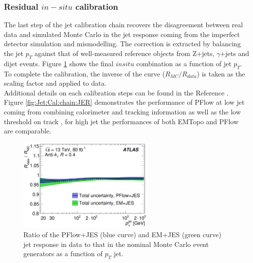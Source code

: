\subsubsection{Residual $in-situ$ calibration}
\label{Jet:Cal:chain:InSitu}
The last step of the jet calibration chain recovers the disagreement between real data and simulated Monte Carlo in the jet response coming from the imperfect detector simulation and mismodelling. The correction is extracted by balancing the jet $p_T$ against that of well-measured reference objects from Z+jets, $\gamma$+jets and dijet events. Figure \ref{fig:Jet:Cal:chain:InSitu} shows the final $in situ$ combination as a function of jet $p_T$. To complete the calibration, the inverse of the curve ($R_{MC}/R_{data}$) is taken as the scaling factor and applied to data. \\
Additional details on each calibration steps can be found in the Reference \cite{JES_Sys_13_TeV}. \\
Figure \ref{fig:Jet:Cal:chain:JER} demonstrates the performance of PFlow at low jet \pT coming from combining calorimeter and tracking information as well as the low threshold on track \pT, for high jet \pT the performances of both EMTopo and PFlow are comparable. 
\begin{figure}[htbp]
    \centering
    \includegraphics[width=0.6\textwidth]{Ch4/Img/Jet_MC_Data_Ration.png}
    \caption{Ratio of the PFlow+JES (blue curve) and EM+JES (green curve) jet response in data to that in the nominal Monte Carlo event generators as a function of $p_T$ jet.}
    \label{fig:Jet:Cal:chain:InSitu}
\end{figure}

